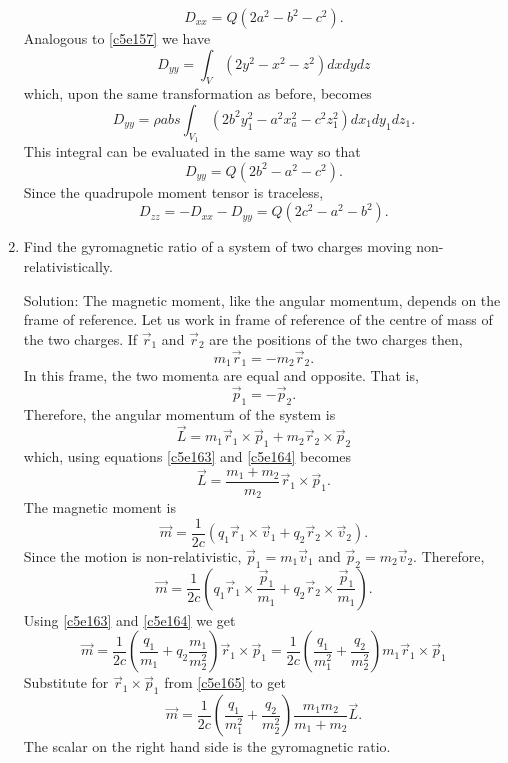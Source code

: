 \begin{enumerate}
\begin{equation}
D_{xx} = Q(2a^2-b^2-c^2).
\end{equation}
Analogous to \eqref{c5e157} we have
\begin{equation}\label{c5e160}
D_{yy} = \int_V(2y^2 - x^2 - z^2)dxdydz
\end{equation}
which, upon the same transformation as before, becomes
\[
D_{yy} = \rho abs\int_{V_1}(2b^2y_1^2 - a^2x_a^2 - c^2z_1^2)dx_1dy_1dz_1.
\]
This integral can be evaluated in the same way so that
\begin{equation}\label{c5e151}
D_{yy} = Q(2b^2 - a^2 - c^2).
\end{equation}
Since the quadrupole moment tensor is traceless,
\begin{equation}\label{c5e162}
D_{zz} = -D_{xx} - D_{yy} = Q(2c^2 - a^2 - b^2).
\end{equation}

\item Find the gyromagnetic ratio of a system of two charges moving non-
relativistically.
\item[Solution:] The magnetic moment, like the angular momentum, depends on the
frame of reference. Let us work in frame of reference of the centre of mass of 
the two charges. If $\vec{r}_1$ and $\vec{r}_2$ are the positions of the two
charges then,
\begin{equation}\label{c5e163}
m_1\vec{r}_1 = -m_2\vec{r}_2.
\end{equation}
In this frame, the two momenta are equal and opposite. That is,
\begin{equation}\label{c5e164}
\vec{p}_1 = -\vec{p}_2.
\end{equation}
Therefore, the angular momentum of the system is
\[
\vec{L} = m_1\vec{r}_1\times\vec{p}_1 + m_2\vec{r}_2\times\vec{p}_2 
\]
which, using equations \eqref{c5e163} and \eqref{c5e164} becomes
\begin{equation}\label{c5e165}
\vec{L} = \frac{m_1 + m_2}{m_2}\vec{r}_1 \times \vec{p}_1.
\end{equation}
The magnetic moment is
\[
\vec{m} = \frac{1}{2c}(q_1\vec{r}_1\times\vec{v}_1 + q_2\vec{r}_2\times\vec{v}_2).
\]
Since the motion is non-relativistic, $\vec{p}_1 = m_1\vec{v}_1$ and $\vec{p}_2
= m_2\vec{v}_2$. Therefore,
\[
\vec{m} = \frac{1}{2c}\left(q_1\vec{r}_1\times\frac{\vec{p}_1}{m_1} + 
q_2\vec{r}_2\times\frac{\vec{p}_1}{m_1}\right).
\]
Using \eqref{c5e163} and \eqref{c5e164} we get
\[
\vec{m} = \frac{1}{2c}\left(\frac{q_1}{m_1} + q_2\frac{m_1}{m_2^2}\right)\vec{r}_1\times\vec{p}_1
= \frac{1}{2c}\left(\frac{q_1}{m_1^2} + \frac{q_2}{m_2^2}\right)m_1\vec{r}_1\times\vec{p}_1
\]
Substitute for $\vec{r}_1 \times \vec{p}_1$ from \eqref{c5e165} to get
\begin{equation}\label{c5e166}
\vec{m} = \frac{1}{2c}\left(\frac{q_1}{m_1^2} + \frac{q_2}{m_2^2}\right)\frac{m_1m_2}{m_1+m_2}\vec{L}.
\end{equation}
The scalar on the right hand side is the gyromagnetic ratio.
\end{enumerate}